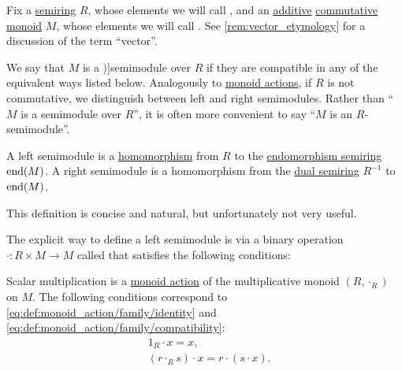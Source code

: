 \begin{definition}\label{def:semimodule}
  Fix a \hyperref[def:semiring]{semiring} \( R \), whose elements we will call , and an \hyperref[con:additive_semigroup]{additive} \hyperref[def:binary_operation/commutative]{commutative} \hyperref[def:monoid]{monoid} \( M \), whose elements we will call . See \cref{rem:vector_etymology} for a discussion of the term \enquote{vector}.

  We say that \( M \) is a \term[ru=полумодуль (\cite[99]{ВечтомовПетров2022Полукольца})]{semimodule} over \( R \) if they are compatible in any of the equivalent ways listed below. Analogously to \hyperref[def:monoid_action]{monoid actions}, if \( R \) is not commutative, we distinguish between left and right semimodules. Rather than \enquote{\( M \) is a semimodule over \( R \)}, it is often more convenient to say \enquote{\( M \) is an \( R \)-semimodule}.

  \begin{thmenum}[series=def:semimodule]
    \mimprovised A left semimodule is a \hyperref[def:semiring/homomorphism]{homomorphism} from \( R \) to the \hyperref[def:endomorphism_semiring]{endomorphism semiring} \( \operatorname{end}(M) \). A right semimodule is a homomorphism from the \hyperref[def:semiring/opposite]{dual semiring} \( R^{-1} \) to \( \operatorname{end}(M) \).

    This definition is concise and natural, but unfortunately not very useful.

     The explicit way to define a left semimodule is via a binary operation \( \cdot: R \times M \to M \) called  that satisfies the following conditions:
    \begin{thmenum}
       Scalar multiplication is a \hyperref[def:monoid_action]{monoid action} of the multiplicative monoid \( (R, \cdot_R) \) on \( M \). The following conditions correspond to \eqref{eq:def:monoid_action/family/identity} and \eqref{eq:def:monoid_action/family/compatibility}:
      \begin{align}
        &1_R \cdot x = x, \label{eq:def:semimodule/operation/scalar_multiplication_action/identity} \\
        &(r \cdot_R s) \cdot x = r \cdot (s \cdot x). \label{eq:def:semimodule/operation/scalar_multiplication_action/compatibility}
      \end{align}


\end{thmenum}
\end{thmenum}
\end{definition}
